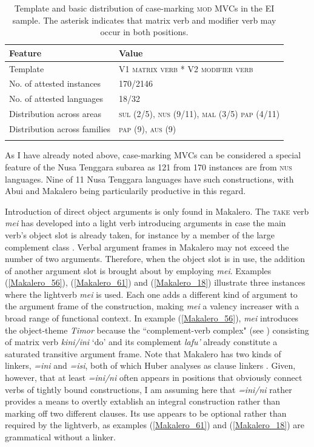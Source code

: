 \begin{table}
\begin{tabular}{ll}
\lsptoprule
Feature&Value\tabularnewline
\midrule
Template&V1 \textsc{matrix verb} * V2 \textsc{modifier verb}\tabularnewline
No. of attested instances& 170/2146 \tabularnewline
No. of attested languages& 18/32 \tabularnewline
Distribution across areas& \textsc{sul} (2/5), \textsc{nus} (9/11), \textsc{mal} (3/5) \textsc{pap} (4/11) \tabularnewline
Distribution across families& \textsc{pap} (9), \textsc{aus} (9) \tabularnewline
\lspbottomrule
\end{tabular}
\caption[Template and basic distribution of case-marking \textsc{mod} MVCs]{Template and basic distribution of case-marking \textsc{mod} MVCs in the EI sample. The asterisk indicates that matrix verb and modifier verb may occur in both positions.}
\label{table:case}
\end{table}

As I have already noted above, case-marking MVCs can be considered a special feature of the Nusa Tenggara subarea as 121 from 170 instances are from \textsc{nus} languages. Nine of 11 Nusa Tenggara languages have such constructions, with Abui and Makalero being particularily productive in this regard.

Introduction of direct object arguments is only found in Makalero. The \textsc{take} verb \textit{mei} has developed into a light verb introducing arguments in case the main verb's object slot is already taken, for instance by a member of the large complement class \citep[203f.]{huber2011}. Verbal argument frames in Makalero may not exceed the number of two arguments. Therefore, when the object slot is in use, the addition of another argument slot is brought about by employing \textit{mei}. Examples (\ref{Makalero_56}), (\ref{Makalero_61}) and (\ref{Makalero_18}) illustrate three instances where the lightverb \textit{mei} is used. Each one adds a different kind of argument to the argument frame of the construction, making \textit{mei} a valency increaser with a broad range of functional context. In example (\ref{Makalero_56}), \textit{mei} introduces the object-theme \textit{Timor} because the ``complement-verb complex" (see \citealt[131f.]{huber2011}) consisting of matrix verb \textit{kini/ini} `do' and its complement \textit{lafu'} already constitute a saturated transitive argument frame. Note that Makalero has two kinds of linkers, \textit{=ini} and \textit{=isi}, both of which Huber analyses as clause linkers \citep[457f.]{huber2011}. Given, however, that at least \textit{=ini/ni} often appears in positions that obviously connect verbs of tightly bound constructions, I am assuming here that \textit{=ini/ni} rather provides a means to overtly extablish an integral construction rather than marking off two different clauses. Its use appears to be optional rather than required by the lightverb, as examples (\ref{Makalero_61}) and (\ref{Makalero_18}) are grammatical without a linker.

